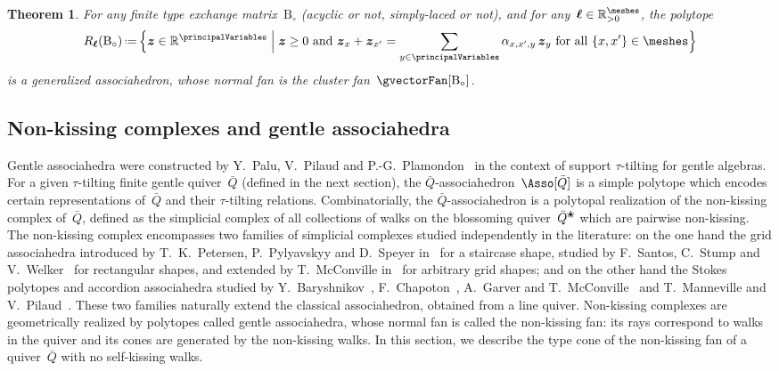 \documentclass{amsart}
\newtheorem{theorem}{Theorem}[section]
\theoremstyle{definition}
\newcommand{\R}{\mathbb{R}} %
\renewcommand{\b}[1]{{\boldsymbol{#1}}} %
\newcommand{\Bigset}[2]{\Big\{ #1 \;\Big|\; #2 \Big\}} %
\newcommand{\eqdef}{\mbox{\,\raisebox{0.2ex}{\scriptsize\ensuremath{\mathrm:}}\ensuremath{=}\,}} %
\newcommand{\B}{\mathrm{B}} %
\newcommand{\quiver}{\bar Q} %
\newcommand{\blossom}{^\text{\ding{96}}} %
\begin{document}
\begin{theorem}
For any finite type exchange matrix~$\B_\circ$ (acyclic or not, simply-laced or not), and for any~$\b{\ell} \in \R_{>0}^{\meshes}$, the polytope
\[
R_{\b{\ell}}(\B_\circ) \eqdef \Bigset{\b{z} \in \R^{\principalVariables}}{\b{z} \ge 0 \text{ and } \b{z}_x + \b{z}_{x'} = \sum_{y \in \principalVariables} \alpha_{x,x',y} \, \b{z}_{y} \text{ for all } \{x,x'\} \in \meshes}
\]
is a generalized associahedron, whose normal fan is the cluster fan~$\gvectorFan[\B_\circ]$.
\end{theorem}


\subsection{Non-kissing complexes and gentle associahedra}

Gentle associahedra were constructed by Y.~Palu, V.~Pilaud and P.-G.~Plamondon~\cite{PaluPilaudPlamondon-nonkissing} in the context of support $\tau$-tilting for gentle algebras.
For a given $\tau$-tilting finite gentle quiver~$\quiver$ (defined in the next section), the $\quiver$-associahedron~$\Asso[\quiver]$ is a simple polytope which encodes certain representations of~$\quiver$ and their $\tau$-tilting relations.
Combinatorially, the $\quiver$-associahedron is a polytopal realization of the non-kissing complex of~$\quiver$, defined as the simplicial complex of all collections of walks on the blossoming quiver~$\quiver\blossom$ which are pairwise non-kissing.
The non-kissing complex encompasses two families of simplicial complexes studied independently in the literature: on the one hand the grid associahedra introduced by T.~K.~Petersen, P.~Pylyavskyy and D.~Speyer in~\cite{PetersenPylyavskyySpeyer} for a staircase shape, studied by F.~Santos, C.~Stump and V.~Welker~\cite{SantosStumpWelker} for rectangular shapes, and extended by T.~McConville in~\cite{McConville} for arbitrary grid shapes; and on the other hand the Stokes polytopes and accordion associahedra studied by Y.~Baryshnikov~\cite{Baryshnikov}, F.~Chapoton~\cite{Chapoton-quadrangulations}, A.~Garver and T.~McConville~\cite{GarverMcConville} and T.~Manneville and V.~Pilaud~\cite{MannevillePilaud-accordion}.
These two families naturally extend the classical associahedron, obtained from a line quiver.
Non-kissing complexes are geometrically realized by polytopes called gentle associahedra, whose normal fan is called the non-kissing fan: its rays correspond to walks in the quiver and its cones are generated by the non-kissing walks.
In this section, we describe the type cone of the non-kissing fan of a quiver~$\quiver$ with no self-kissing walks.
\end{document}
